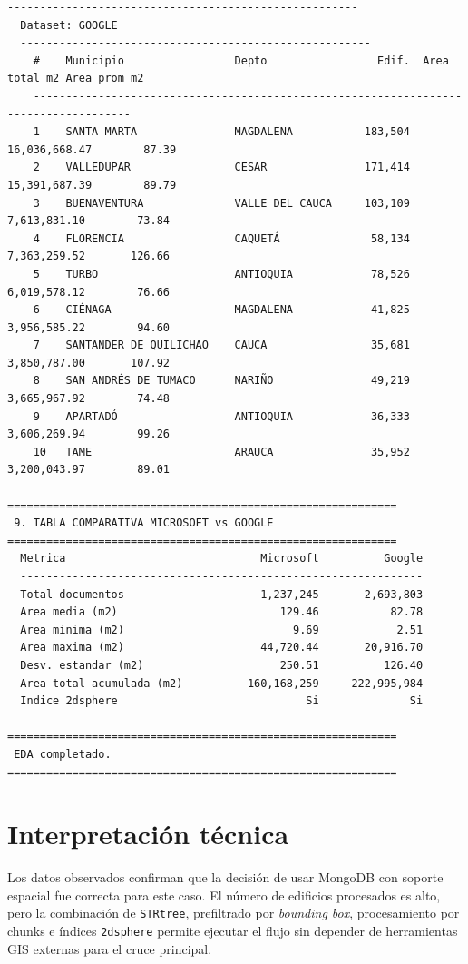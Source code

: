 \documentclass[12pt,a4paper]{article}
\begin{document}
\begin{lstlisting}[style=evidence]
  ------------------------------------------------------
  Dataset: GOOGLE
  ------------------------------------------------------
    #    Municipio                 Depto                 Edif.  Area total m2 Area prom m2
    -------------------------------------------------------------------------------------
    1    SANTA MARTA               MAGDALENA           183,504  16,036,668.47        87.39
    2    VALLEDUPAR                CESAR               171,414  15,391,687.39        89.79
    3    BUENAVENTURA              VALLE DEL CAUCA     103,109   7,613,831.10        73.84
    4    FLORENCIA                 CAQUETÁ              58,134   7,363,259.52       126.66
    5    TURBO                     ANTIOQUIA            78,526   6,019,578.12        76.66
    6    CIÉNAGA                   MAGDALENA            41,825   3,956,585.22        94.60
    7    SANTANDER DE QUILICHAO    CAUCA                35,681   3,850,787.00       107.92
    8    SAN ANDRÉS DE TUMACO      NARIÑO               49,219   3,665,967.92        74.48
    9    APARTADÓ                  ANTIOQUIA            36,333   3,606,269.94        99.26
    10   TAME                      ARAUCA               35,952   3,200,043.97        89.01

============================================================
 9. TABLA COMPARATIVA MICROSOFT vs GOOGLE
============================================================
  Metrica                              Microsoft          Google
  --------------------------------------------------------------
  Total documentos                     1,237,245       2,693,803
  Area media (m2)                         129.46           82.78
  Area minima (m2)                          9.69            2.51
  Area maxima (m2)                     44,720.44       20,916.70
  Desv. estandar (m2)                     250.51          126.40
  Area total acumulada (m2)          160,168,259     222,995,984
  Indice 2dsphere                             Si              Si

============================================================
 EDA completado.
============================================================
\end{lstlisting}

\section{Interpretaci\'on t\'ecnica}

Los datos observados confirman que la decisi\'on de usar MongoDB con soporte espacial fue correcta para este caso. El n\'umero de edificios procesados es alto, pero la combinaci\'on de \texttt{STRtree}, prefiltrado por \textit{bounding box}, procesamiento por chunks e \'indices \texttt{2dsphere} permite ejecutar el flujo sin depender de herramientas GIS externas para el cruce principal.
\end{document}

